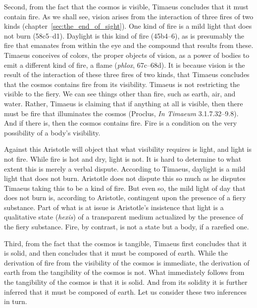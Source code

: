 Second, from the fact that the cosmos is visible, Timaeus concludes that it must contain fire. As we shall see, vision arises from the interaction of three fires of two kinds (chapter~\ref{sec:the_end_of_sight}). One kind of fire is a mild light that does not burn (58c5–d1). Daylight is this kind of fire (45b4–6), as is presumably the fire that emanates from within the eye and the compound that results from these. Timaeus conceives of colors, the proper objects of vision, as a power of bodies to emit a different kind of fire, a flame (\emph{phlox}, 67c–68d). It is because vision is the result of the interaction of these three fires of two kinds, that Timaeus concludes that the cosmos contains fire from its visibility. Timaeus is not restricting the visible to the fiery. We can see things other than fire, such as earth, air, and water. Rather, Timaeus is claiming that if anything at all is visible, then there must be fire that illuminates the cosmos (Proclus, \emph{In Timaeum} 3.1.7.32--9.8). And if there is, then the cosmos contains fire. Fire is a condition on the very possibility of a body's visibility.

Against this Aristotle will object that what visibility requires is light, and light is not fire. While fire is hot and dry, light is not. It is hard to determine to what extent this is merely a verbal dispute. According to Timaeus, daylight is a mild light that does not burn. Aristotle does not dispute this so much as he disputes Timaeus taking this to be a kind of fire. But even so, the mild light of day that does not burn is, according to Aristotle, contingent upon the presence of a fiery substance. Part of what is at issue is Aristotle's insistence that light is a qualitative state (\emph{hexis}) of a transparent medium actualized by the presence of the fiery substance. Fire, by contrast, is not a state but a body, if a rarefied one.

Third, from the fact that the cosmos is tangible, Timaeus first concludes that it is solid, and then concludes that it must be composed of earth. While the derivation of fire from the visibility of the cosmos is immediate, the derivation of earth from the tangibility of the cosmos is not. What immediately follows from the tangibility of the cosmos is that it is solid. And from its solidity it is further inferred that it must be composed of earth. Let us consider these two inferences in turn. 

